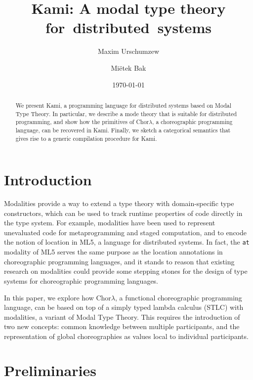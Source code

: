 \documentclass{scrartcl}
\title{Kami: A modal type theory for~distributed~systems}
\author{Maxim Urschumzew \and Miëtek Bak}
\date{\today}
\theoremstyle{definition}
\theoremstyle{plain}
\begin{document}
\maketitle
\begin{abstract}
  \noindent
  We present Kami, a programming language for distributed systems based on
  Modal Type Theory\cite{gratzer2023syntax}. In particular, we describe a mode
  theory that is suitable for distributed programming, and show how the
  primitives of Chor$\lambda$\cite{cruz2022functional}, a choreographic
  programming language, can be recovered in Kami. Finally, we sketch a
  categorical semantics that gives rise to a generic compilation procedure for
  Kami.
\end{abstract}

\section{Introduction}
Modalities provide a way to extend a type theory with domain-specific type
constructors, which can be used to track runtime properties of code directly in
the type system. For example, modalities have been used to represent
unevaluated code for metaprogramming and staged
computation\cite{davies2001modal}, and to encode the notion of location in
ML5\cite{murphy2008modal}, a language for distributed systems. In fact, the
\texttt{at} modality of ML5 serves the same purpose as the location annotations
in choreographic programming languages\cite{cruz2022functional,
giallorenzo2024choral}, and it stands to reason that existing research on
modalities could provide some stepping stones for the design of type systems
for choreographic programming languages.

In this paper, we explore how Chor$\lambda$\cite{cruz2022functional}, a
functional choreographic programming language, can be based on top of a simply
typed lambda calculus (STLC) with modalities, a variant of Modal Type
Theory\cite{gratzer2023syntax}. This requires the introduction of two new
concepts: common knowledge between multiple participants, and the representation
of global choreographies as values local to individual participants.

\section{Preliminaries}
\end{document}
